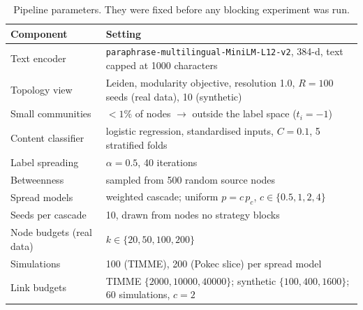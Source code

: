 \begin{table}[t]
\centering
\caption{Pipeline parameters. They were fixed before any blocking experiment was
run.}
\label{tab:params}
\small
\begin{tabularx}{\linewidth}{@{}l X@{}}
\toprule
Component & Setting \\
\midrule
Text encoder & \texttt{paraphrase-\allowbreak multilingual-\allowbreak MiniLM-\allowbreak L12-\allowbreak v2}, 384-d, text capped at 1000 characters \\
Topology view & Leiden, modularity objective, resolution 1.0, $R=100$ seeds (real data), 10 (synthetic) \\
Small communities & $<1\%$ of nodes $\to$ outside the label space ($t_i=-1$) \\
Content classifier & logistic regression, standardised inputs, $C=0.1$, 5 stratified folds \\
Label spreading & $\alpha = 0.5$, 40 iterations \\
Betweenness & sampled from 500 random source nodes \\
Spread models & weighted cascade; uniform $p = c\,p_c$, $c \in \{0.5, 1, 2, 4\}$ \\
Seeds per cascade & 10, drawn from nodes no strategy blocks \\
Node budgets (real data) & $k \in \{20, 50, 100, 200\}$ \\
Simulations & 100 (TIMME), 200 (Pokec slice) per spread model \\
Link budgets & TIMME $\{2000, 10000, 40000\}$; synthetic $\{100, 400, 1600\}$; 60 simulations, $c=2$ \\
\bottomrule
\end{tabularx}
\end{table}
